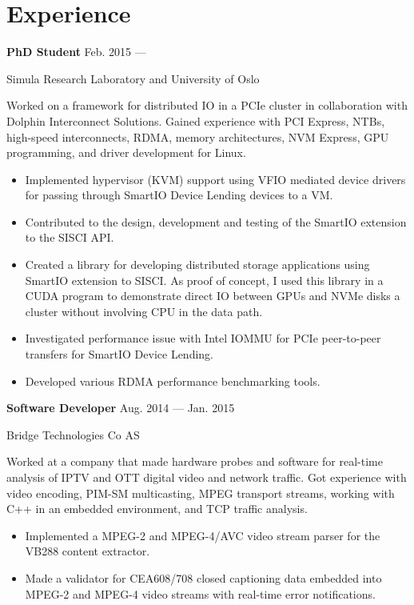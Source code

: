 \section{Experience}
\parbox[t][][t]{\linewidth}{
	\parbox{\linewidth}{\textbf{PhD Student}
		\hfill {{Feb. 2015 --- \phantom{Sep. 2018}}}}
		\smallbreak
	\parbox{\linewidth}{Simula Research Laboratory and University of Oslo}

	\bigskip
	Worked on a framework for distributed IO in a PCIe cluster in
	collaboration with Dolphin Interconnect Solutions. Gained
	experience with PCI Express,  NTBs, high-speed interconnects, RDMA, memory
	architectures, NVM Express, GPU programming, and driver development for Linux.

	\bigskip
	\begin{itemize}
		\item{Implemented hypervisor (KVM) support using VFIO mediated device drivers
			for passing through SmartIO Device Lending devices to a VM.}\\[-.6em]
		\item{Contributed to the design, development and testing of the SmartIO
			extension to the SISCI API.}\\[-.6em]
		\item{Created a library for developing distributed storage
			applications using SmartIO extension to SISCI.
			As proof of concept, I used this library in a CUDA program to demonstrate direct
			IO between GPUs and NVMe disks a cluster without
			involving CPU in the data path.}\\[-.6em]
		\item{Investigated performance issue with Intel IOMMU for PCIe
			peer-to-peer transfers for SmartIO Device Lending.}\\[-.6em]
		\item{Developed various RDMA performance benchmarking tools.}
	\end{itemize}
	\bigskip
	\bigskip
}

\parbox[t][][t]{\linewidth}{
	\parbox{\linewidth}{\textbf{Software Developer}
		\hfill {{Aug. 2014 --- Jan. 2015}}}
		\smallbreak
	\parbox{\linewidth}{Bridge Technologies Co AS}

	\bigskip
	Worked at a company that made hardware probes and software
	for real-time analysis of IPTV and OTT digital video and network
	traffic. Got experience with video encoding, PIM-SM multicasting, MPEG transport
	streams, working with C++ in an embedded environment, and TCP
	traffic analysis.

	\bigskip
	\begin{itemize}
		\item{Implemented a MPEG-2 and MPEG-4/AVC video stream parser for  the
			VB288 content extractor.}\\[-.6em]
		\item{Made a validator for CEA608/708 closed captioning data
		embedded into MPEG-2 and MPEG-4 video streams with real-time
			error notifications.}
	\end{itemize}
	\bigskip
	\bigskip
}

